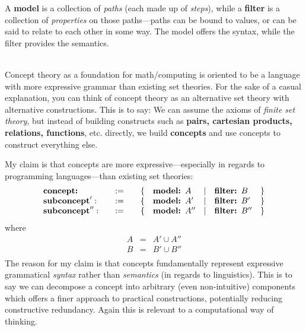 \documentclass[twoside]{article}
\newcommand{\bfmbox}[1]{\mbox{\bfseries #1}}
\begin{document}
A {\bfseries model} is a collection of \emph{paths} (each made up of \emph{steps}), while a {\bfseries filter} is a collection
of \emph{properties} on those paths---paths can be bound to values, or can be said to relate to each other in some way.
The model offers the syntax, while the filter provides the semantics.

\ \\[0.5cm]

Concept theory as a foundation for math/computing is oriented to be a language with more expressive grammar than existing set theories.
For the sake of a casual explanation, you can think of concept theory as an alternative set theory with alternative constructions.
This is to say: We can assume the axioms of \emph{finite set theory}, but instead of building constructs such as
{\bfseries pairs, cartesian products, relations, functions}, etc. directly, we build {\bfseries concepts} and use concepts
to construct everything else.

My claim is that concepts are more expressive---especially in regards to programming languages---than existing set theories:
$$ \begin{array}{lcllcll}
\bfmbox{concept:} \quad & := \quad & \{ &  \bfmbox{model: } A & | & \bfmbox{filter: } B & \}		\\
\bfmbox{subconcept}': \quad & := \quad & \{ & \bfmbox{model: } A' & | & \bfmbox{filter: } B' & \}	\\
\bfmbox{subconcept}'': \quad & := \quad & \{ & \bfmbox{model: } A'' & | & \bfmbox{filter: } B'' & \}	\\
\end{array} $$
where
$$ \begin{array}{rcl}
A & = & A'\cup A''		\\
B & = & B'\cup B''		\\
\end{array} $$
The reason for my claim is that concepts fundamentally represent expressive grammatical \emph{syntax} rather than
\emph{semantics} (in regards to linguistics). This is to say we can decompose a concept into arbitrary (even non-intuitive)
components which offers a finer approach to practical constructions, potentially reducing constructive redundancy.
Again this is relevant to a computational way of thinking.

\newpage
\end{document}
